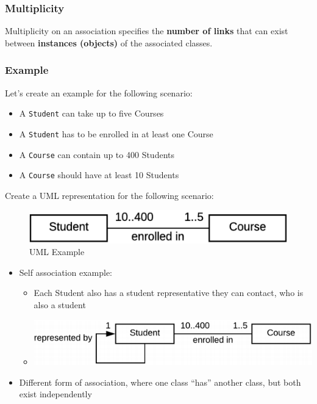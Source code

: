 \documentclass[]{article}
\providecommand{\tightlist}{%
  \setlength{\itemsep}{0pt}\setlength{\parskip}{0pt}}
\begin{document}
\hypertarget{multiplicity}{%
\subsubsection{Multiplicity}\label{multiplicity}}

Multiplicity on an association specifies the \textbf{number of links}
that can exist between \textbf{instances (objects)} of the associated
classes.

\hypertarget{example}{%
\subsubsection{Example}\label{example}}

Let's create an example for the following scenario:

\begin{itemize}
\tightlist
\item
  A \texttt{Student} can take up to five Courses
\item
  A \texttt{Student} has to be enrolled in at least one Course
\item
  A \texttt{Course} can contain up to 400 Students
\item
  A \texttt{Course} should have at least 10 Students
\end{itemize}

Create a UML representation for the following scenario:

\begin{figure}
\centering
\includegraphics{images/uml5.png}
\caption{UML Example}
\end{figure}

\begin{itemize}
\tightlist
\item
  Self association example:

  \begin{itemize}
  \tightlist
  \item
    Each Student also has a student representative they can contact, who
    is also a student
  \item
    \includegraphics{images/uml6.png}
  \end{itemize}
\item
  Different form of association, where one class ``has'' another class,
  but both exist independently
\end{itemize}
\end{document}
